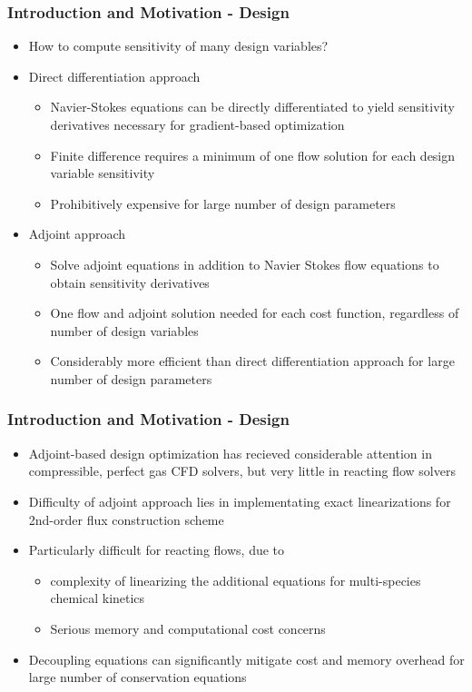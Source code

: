 \documentclass{beamer}
\begin{document}
\begin{frame}
  \frametitle{Introduction and Motivation - Design}
  \begin{itemize}
    \item How to compute sensitivity of many design variables?
    \item Direct differentiation approach
      \begin{itemize}
        \item Navier-Stokes equations can be directly differentiated to yield
          sensitivity derivatives necessary for gradient-based optimization
        \item Finite difference requires a minimum of one flow solution for each
          design variable sensitivity
        \item Prohibitively expensive for large number of design parameters
      \end{itemize}
  \item Adjoint approach
    \begin{itemize}
      \item Solve adjoint equations in addition to Navier Stokes flow equations to
        obtain sensitivity derivatives
      \item One flow and adjoint solution needed for each cost function,
        regardless of number of design variables
      \item Considerably more efficient than direct differentiation approach for
        large number of design parameters
    \end{itemize}
  \end{itemize}
\end{frame}
\begin{frame}
  \frametitle{Introduction and Motivation - Design}
  \begin{itemize}
    \item Adjoint-based design optimization has recieved considerable attention
      in compressible, perfect gas CFD solvers, but very little in reacting flow
      solvers
    \item Difficulty of adjoint approach lies in implementating exact
      linearizations for 2nd-order flux construction scheme
    \item Particularly difficult for reacting flows, due to 
      \begin{itemize}
        \item complexity of linearizing the additional equations for
          multi-species chemical kinetics
        \item Serious memory and computational cost concerns
      \end{itemize}
    \item Decoupling equations can significantly mitigate cost and memory
      overhead for large number of conservation equations
  \end{itemize}
\end{frame}
\end{document}
